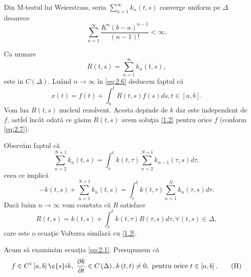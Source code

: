 \documentclass[a4paper,12pt,oneside]{report}
\begin{document}
\noindent Din M-testul lui Weierstrass, seria \(\sum_{n=1}^{\infty }k_{n}\left ( t,s \right )\) converge uniform pe \(\Delta\) deoarece
\begin{displaymath}
\sum_{n=1}^{\infty }\frac{K^{n}\left ( b-a \right )^{n-1}}{\left ( n-1 \right )!}< \infty.
\end{displaymath}

\noindent Ca urmare
\begin{displaymath}
R\left ( t,s \right ) = \sum_{n=1}^{\infty }k_{n}\left ( t,s \right ),
\end{displaymath}
este in \(C\left ( \Delta  \right ).\) Lu\^{a}nd \(n\rightarrow \infty\) \^{i}n \ref{eq:2.6} deducem faptul c\u{a}
\begin{displaymath}
x\left ( t \right ) = f\left ( t \right ) + \int_{a}^{t}R\left ( t,s \right )f\left ( s \right )ds, t\in \left [ a,b \right ]. \label{eq:2.7} \tag{2.7}
\end{displaymath}
Vom lua  \(R\left ( t,s \right )\) nucleul rezolvent. Acesta depinde de \(k\) dar este independent de \(f\), astfel \^{i}nc\^{a}t odat\u{a} ce g\u{a}sim \(R\left ( t,s \right )\) avem solu\c{t}ia \ref{1.2} pentru orice \(f\) (conform \ref{eq:2.7}).

\noindent Oberv\u{a}m faptul c\u{a}
\begin{displaymath}
\sum_{n=2}^{N+1}k_{n}\left ( t,s \right ) = \int_{s}^{t}k\left ( t,\tau  \right )\sum_{n=2}^{N+1}k_{n-1}\left ( \tau ,s \right )d\tau,
\end{displaymath}
ceea ce implic\u{a}
\begin{displaymath}
-k\left ( t,s \right ) + \sum_{n=1}^{N+1}k_{n}\left ( t,s \right ) = \int_{s}^{t}k\left ( t,\tau  \right )\sum_{n=1}^{N}k_{n}\left ( \tau ,s \right )d\tau .
\end{displaymath}
Dac\u{a} lu\u{a}m  \(n\rightarrow \infty\) vom constata c\u{a} \(R\) satisface
\begin{displaymath}
R\left ( t,s \right ) = k\left ( t,s \right ) + \int_{s}^{t}k\left ( t,\tau  \right )R\left ( \tau ,s \right )d\tau , \forall \left ( t,s \right )\in \Delta ,
\end{displaymath}
care este o ecua\c{t}ie Volterra similar\u{a} cu \ref{1.2}.

\noindent Acum s\u{a} examin\u{a}m ecua\c{t}ia \ref{eq:2.1}. Presupunem c\u{a}
\begin{displaymath}
f\in C^{1}\left [ a,b \right ] \c{s}i k,~ \frac{\partial k}{\partial t}\in C\left ( \Delta  \right ), k\left ( t,t \right )\neq 0,~ \text{pentru orice}~  t \in \left [ a,b \right ]. \label{eq:H} \tag{H}
\end{displaymath}
\end{document}
